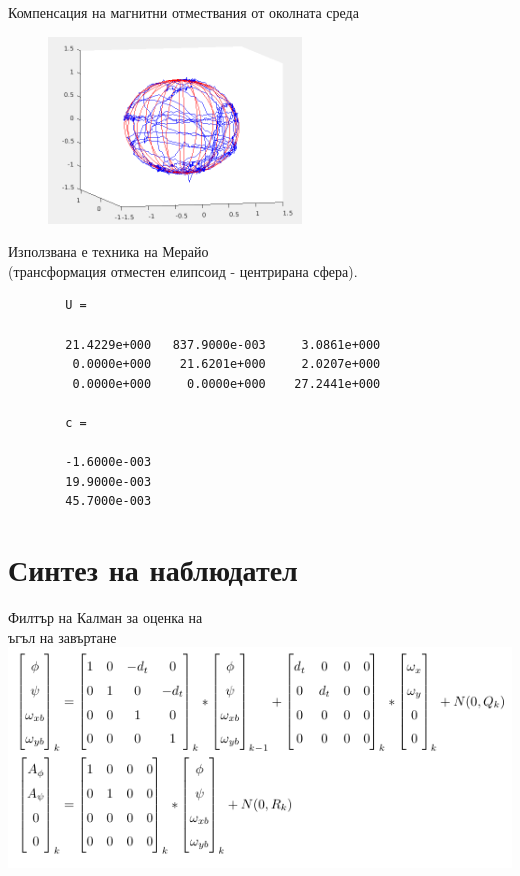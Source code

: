 \documentclass{beamer}
\begin{document}
\begin{frame}{Компенсация на магнитни отмествания от околната среда}
	\pause
	\begin{figure}[!h]
		\centering
   		\includegraphics[width=0.6\textwidth]{Images/mag_calibration.png}
	\end{figure}
	\pause
	Използвана е техника на Мерайо\cite{merayo2000scalar} \\(трансформация отместен елипсоид - центрирана сфера).
\end{frame}


\begin{frame}[fragile]
	\pause
	\begin{verbatim}
		U =
	
		21.4229e+000   837.9000e-003     3.0861e+000
		 0.0000e+000    21.6201e+000     2.0207e+000
		 0.0000e+000     0.0000e+000    27.2441e+000
	
		c =
	
		-1.6000e-003
		19.9000e-003
		45.7000e-003
	\end{verbatim}
	\end{frame}




\section{Синтез на наблюдател}

\begin{frame}{Филтър на Калман за оценка на \\ъгъл на завъртане}
	\pause
	\includegraphics[width=\textwidth]{Images/kf.png}
\end{frame}
\end{document}

